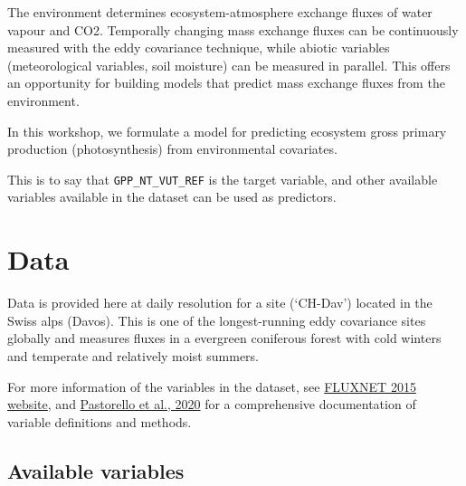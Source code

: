 \documentclass[
]{book}
\begin{document}
The environment determines ecosystem-atmosphere exchange fluxes of water vapour and CO2. Temporally changing mass exchange fluxes can be continuously measured with the eddy covariance technique, while abiotic variables (meteorological variables, soil moisture) can be measured in parallel. This offers an opportunity for building models that predict mass exchange fluxes from the environment.

In this workshop, we formulate a model for predicting ecosystem gross primary production (photosynthesis) from environmental covariates.

This is to say that \texttt{GPP\_NT\_VUT\_REF} is the target variable, and other available variables available in the dataset can be used as predictors.

\hypertarget{data}{%
\section{Data}\label{data}}

Data is provided here at daily resolution for a site (`CH-Dav') located in the Swiss alps (Davos). This is one of the longest-running eddy covariance sites globally and measures fluxes in a evergreen coniferous forest with cold winters and temperate and relatively moist summers.

For more information of the variables in the dataset, see \href{http://fluxnet.fluxdata.org/data/fluxnet2015-dataset/}{FLUXNET 2015 website}, and \href{https://www.nature.com/articles/s41597-020-0534-3}{Pastorello et al., 2020} for a comprehensive documentation of variable definitions and methods.

\hypertarget{available-variables}{%
\subsection{Available variables}\label{available-variables}}
\end{document}
